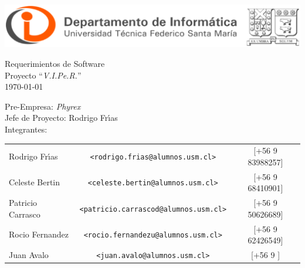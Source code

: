 \documentclass[letterpaper,12pt]{article} %
\numberwithin{equation}{section} %
\numberwithin{figure}{section} %
\numberwithin{table}{section} %
\begin{document}
\begin{titlepage} %
\thispagestyle{empty} %
\begin{center}
\includegraphics[scale=0.35]{logoUSM-DI.eps}
\end{center}

\vspace{3cm} %
\begin{center} %
{\Huge Requerimientos de Software \\
 \huge Proyecto ``\emph{V.I.Pe.R.}''\\
  \normalsize\today
}
\end{center}

\vspace{6cm}

\vfill
\begin{flushleft} %
Pre-Empresa: \emph{Phyrex}\\
Jefe de Proyecto: Rodrigo Fr\'{\i}as\\
Integrantes:
\begin{table}[hb]
  \begin{tabular}{lcc}
    Rodrigo Fr\'{\i}as & \texttt{\small <rodrigo.frias@alumnos.usm.cl>} & [+56 9 83988257] \\
    Celeste Bertin & \texttt{\small <celeste.bertin@alumnos.usm.cl>} &[+56 9 68410901]\\
    Patricio Carrasco &\texttt{\small <patricio.carrascod@alumnos.usm.cl>} &[+56 9 50626689]\\
    Rocio Fernandez &\texttt{\small <rocio.fernandezu@alumnos.usm.cl>} & [+56 9 62426549]\\
    Juan Avalo & \texttt{\small <juan.avalo@alumnos.usm.cl>} & [+56 9 ]\\
  \end{tabular}
\end{table}
\end{flushleft}
\end{titlepage}

\end{document}
